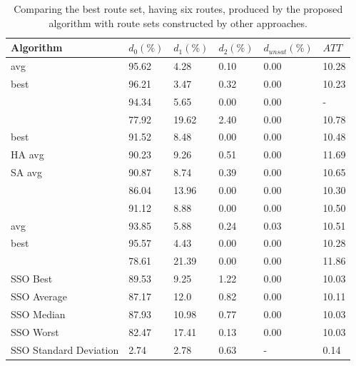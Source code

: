     \begin{table}[H]
    \centering
    \hspace*{-1.0cm}
    \begin{tabular}{|l||l|l|l|l|l|}
    \hline
    Algorithm & $d_0(\%)$ & $d_1(\%)$ & $d_2(\%)$ & $d_{unsat}(\%)$ & $ATT$ \\
    \hline
    \citet{kechagiopoulos14} avg & 95.62 & 4.28 & 0.10 & 0.00 & 10.28 \\
    \citet{kechagiopoulos14} best & 96.21 & 3.47 & 0.32 & 0.00 & 10.23 \\
    \citet{nikolic14} & 94.34 & 5.65 & 0.00 & 0.00 & - \\
    \citet{kidwai98} & 77.92 & 19.62 & 2.40 & 0.00 & 10.78 \\
    \citet{fan10} best & 91.52 & 8.48 & 0.00 & 0.00 & 10.48  \\
    \citet{fan10} HA avg & 90.23 & 9.26 & 0.51 & 0.00 & 11.69 \\
    \citet{fan10} SA avg & 90.87 & 8.74 & 0.39 & 0.00 & 10.65 \\
    \citet{chakroborty02} & 86.04 & 13.96 & 0.00 & 0.00 & 10.30 \\
    \citet{zhang10} & 91.12 & 8.88 & 0.00 & 0.00 & 10.50 \\
    \citet{chew12} avg & 93.85 & 5.88 & 0.24 & 0.03 & 10.51 \\
    \citet{chew12} best & 95.57 & 4.43 & 0.00 & 0.00 & 10.28 \\
    \citet{baaj91} & 78.61 & 21.39 & 0.00 & 0.00 & 11.86 \\
    \hline
    \hline
    SSO Best & 89.53 & 9.25 & 1.22 & 0.00 & 10.03\\
    SSO Average & 87.17 & 12.0 & 0.82 & 0.00 & 10.11\\
    SSO Median & 87.93 & 10.98 & 0.77 & 0.00 & 10.03\\
    SSO Worst & 82.47 & 17.41 & 0.13 & 0.00 & 10.03\\
    SSO Standard Deviation & 2.74 & 2.78 & 0.63 & - & 0.14\\
    \hline
    \end{tabular}
    \caption {Comparing the best route set, having six routes, produced by the proposed algorithm with route sets constructed by other approaches.}
    \label{table:performanceComparison_6}
    \end{table}


